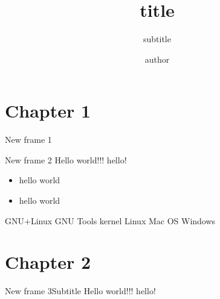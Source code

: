 \documentclass[dracula,Frankfurt,12pt]{darkbeamer}
\author{author}
\title{title}
\subtitle{subtitle}
\institute{My University}
\begin{document}
\section{Chapter 1}
\begin{frame}{New frame 1}
	\titlepage
\end{frame}

\begin{frame}{New frame 2}
	Hello world!!! \alert{hello!}
	\begin{itemize}
		\item hello world
		\item hello world
	\end{itemize}
	\begin{outline}
		\1 GNU+Linux
			\2 GNU Tools
			\2 kernel Linux
		\1 Mac OS
		\1 Windows
	\end{outline}

\end{frame}

\section{Chapter 2}
\begin{frame}{New frame 3}{Subtitle}
	Hello world!!! \alert{hello!}
\end{frame}
\end{document}
